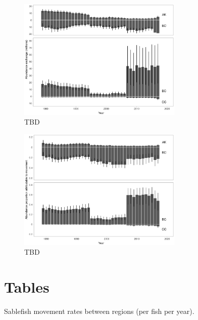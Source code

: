 \documentclass{article}
\begin{document}
\begin{figure}[htb]
    \centering
    \includegraphics[width = 0.7\textwidth]{bar-abundance-exchange}
    \caption{TBD}
    \label{fig:bar-abundance-exchange}
\end{figure}

\begin{figure}[htb]
    \centering
    \includegraphics[width = 0.7\textwidth]{bar-percent-attributable}
    \caption{TBD}
    \label{fig:bar-percent-attributable}
\end{figure}

\section{Tables}


\begin{table}[h]
  \begin{center}
  \caption{Sablefish movement rates between regions (per fish per year).}
  \label{tab:movement-rate-regions-6-mean}
  \end{center}
\end{table}
\end{document}
